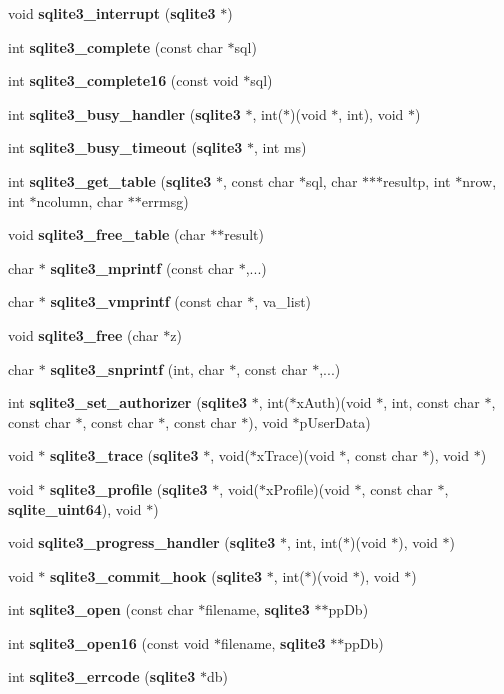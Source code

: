 \begin{DoxyCompactItemize}
\item 
void {\bf sqlite3\_\-interrupt} ({\bf sqlite3} $\ast$)
\item 
int {\bf sqlite3\_\-complete} (const char $\ast$sql)
\item 
int {\bf sqlite3\_\-complete16} (const void $\ast$sql)
\item 
int {\bf sqlite3\_\-busy\_\-handler} ({\bf sqlite3} $\ast$, int($\ast$)(void $\ast$, int), void $\ast$)
\item 
int {\bf sqlite3\_\-busy\_\-timeout} ({\bf sqlite3} $\ast$, int ms)
\item 
int {\bf sqlite3\_\-get\_\-table} ({\bf sqlite3} $\ast$, const char $\ast$sql, char $\ast$$\ast$$\ast$resultp, int $\ast$nrow, int $\ast$ncolumn, char $\ast$$\ast$errmsg)
\item 
void {\bf sqlite3\_\-free\_\-table} (char $\ast$$\ast$result)
\item 
char $\ast$ {\bf sqlite3\_\-mprintf} (const char $\ast$,...)
\item 
char $\ast$ {\bf sqlite3\_\-vmprintf} (const char $\ast$, va\_\-list)
\item 
void {\bf sqlite3\_\-free} (char $\ast$z)
\item 
char $\ast$ {\bf sqlite3\_\-snprintf} (int, char $\ast$, const char $\ast$,...)
\item 
int {\bf sqlite3\_\-set\_\-authorizer} ({\bf sqlite3} $\ast$, int($\ast$xAuth)(void $\ast$, int, const char $\ast$, const char $\ast$, const char $\ast$, const char $\ast$), void $\ast$pUserData)
\item 
void $\ast$ {\bf sqlite3\_\-trace} ({\bf sqlite3} $\ast$, void($\ast$xTrace)(void $\ast$, const char $\ast$), void $\ast$)
\item 
void $\ast$ {\bf sqlite3\_\-profile} ({\bf sqlite3} $\ast$, void($\ast$xProfile)(void $\ast$, const char $\ast$, {\bf sqlite\_\-uint64}), void $\ast$)
\item 
void {\bf sqlite3\_\-progress\_\-handler} ({\bf sqlite3} $\ast$, int, int($\ast$)(void $\ast$), void $\ast$)
\item 
void $\ast$ {\bf sqlite3\_\-commit\_\-hook} ({\bf sqlite3} $\ast$, int($\ast$)(void $\ast$), void $\ast$)
\item 
int {\bf sqlite3\_\-open} (const char $\ast$filename, {\bf sqlite3} $\ast$$\ast$ppDb)
\item 
int {\bf sqlite3\_\-open16} (const void $\ast$filename, {\bf sqlite3} $\ast$$\ast$ppDb)
\item 
int {\bf sqlite3\_\-errcode} ({\bf sqlite3} $\ast$db)

\end{DoxyCompactItemize}
